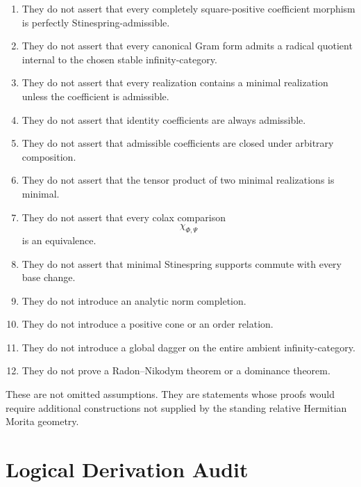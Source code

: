 \begin{enumerate}
  \item They do not assert that every completely square-positive coefficient
  morphism is perfectly Stinespring-admissible.

  \item They do not assert that every canonical Gram form admits a radical
  quotient internal to the chosen stable infinity-category.

  \item They do not assert that every realization contains a minimal
  realization unless the coefficient is admissible.

  \item They do not assert that identity coefficients are always admissible.

  \item They do not assert that admissible coefficients are closed under
  arbitrary composition.

  \item They do not assert that the tensor product of two minimal
  realizations is minimal.

  \item They do not assert that every colax comparison
  \[
    \chi_{\Phi,\Psi}
  \]
  is an equivalence.

  \item They do not assert that minimal Stinespring supports commute with
  every base change.

  \item They do not introduce an analytic norm completion.

  \item They do not introduce a positive cone or an order relation.

  \item They do not introduce a global dagger on the entire ambient
  infinity-category.

  \item They do not prove a Radon--Nikodym theorem or a dominance theorem.
\end{enumerate}

These are not omitted assumptions. They are statements whose proofs would
require additional constructions not supplied by the standing relative
Hermitian Morita geometry.

\section{Logical Derivation Audit}
\label{sec:higher-stinespring-derivation-audit}

